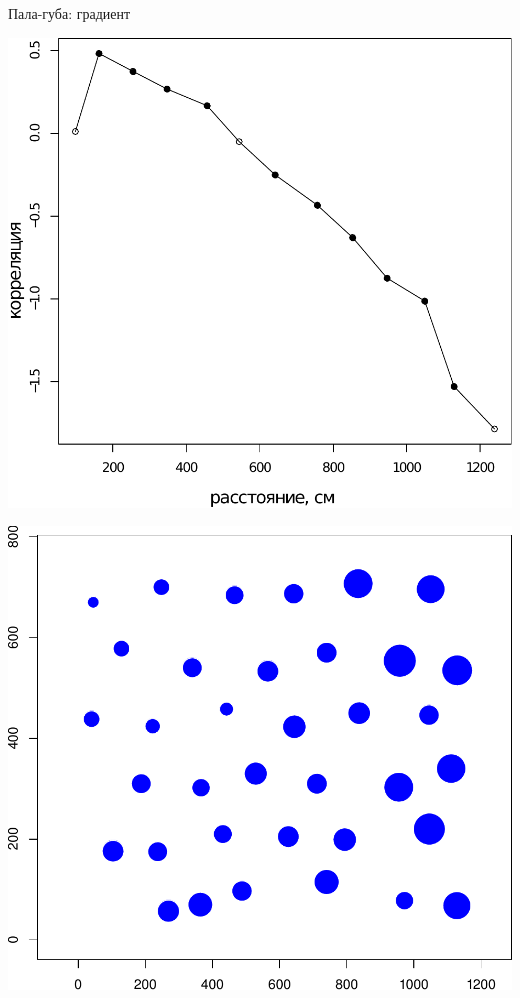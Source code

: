 \documentclass{beamer}
\begin{document}
\begin{frame}{Пала-губа: градиент}
	\begin{minipage}[t]{.7\linewidth}
 \begin{center}
		\includegraphics[width=\textwidth]{Pala_moran_N_Macoma_balthica_.pdf}
 \end{center}
	\end{minipage}
	\begin{minipage}[t]{.28\linewidth}
 \begin{center}
		\includegraphics[width=\textwidth]{Pala_N_Macoma_bubbles.pdf}

 \end{center}
	\end{minipage}
\end{frame}
\end{document}
